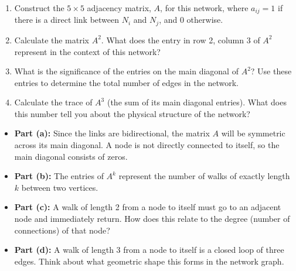 \begin{problem}
\begin{enumerate}[label=\textbf{(\alph*)}]
    \item Construct the $5 \times 5$ adjacency matrix, $A$, for this network, where $a_{ij} = 1$ if there is a direct link between $N_i$ and $N_j$, and $0$ otherwise.
    \item Calculate the matrix $A^2$. What does the entry in row 2, column 3 of $A^2$ represent in the context of this network?
    \item What is the significance of the entries on the main diagonal of $A^2$? Use these entries to determine the total number of edges in the network.
    \item Calculate the trace of $A^3$ (the sum of its main diagonal entries). What does this number tell you about the physical structure of the network?
\end{enumerate}
\end{problem}

\begin{hint}
\begin{itemize}
    \item \textbf{Part (a):} Since the links are bidirectional, the matrix $A$ will be symmetric across its main diagonal. A node is not directly connected to itself, so the main diagonal consists of zeros.
    \item \textbf{Part (b):} The entries of $A^k$ represent the number of walks of exactly length $k$ between two vertices.
    \item \textbf{Part (c):} A walk of length 2 from a node to itself must go to an adjacent node and immediately return. How does this relate to the degree (number of connections) of that node?
    \item \textbf{Part (d):} A walk of length 3 from a node to itself is a closed loop of three edges. Think about what geometric shape this forms in the network graph.
\end{itemize}
\end{hint}

